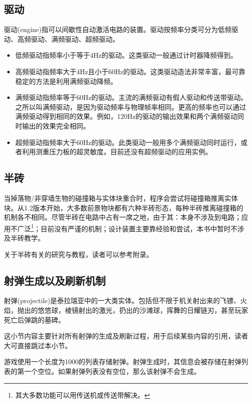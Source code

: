 \subsection{驱动}

驱动(engine)指可以间歇性自动激活电路的装置。驱动按频率分类可分为低频驱动、高频驱动、满频驱动、超频驱动。

\begin{itemize}
\item 低频驱动指频率小于等于4Hz的驱动。这类驱动一般通过计时器降频得到。
\item 高频驱动指频率大于4Hz且小于60Hz的驱动。这类驱动造法非常丰富，最可靠稳定的方法是利用满频驱动降频。
\item 满频驱动指频率等于60Hz的驱动。主流的满频驱动有假人驱动和传送带驱动。之所以叫满频驱动，是因为驱动频率与物理帧率相同。更高的频率也可以通过满频驱动得到相同的效果。例如，120Hz的驱动的输出效果和两个满频驱动同时输出的效果完全相同。
\item 超频驱动指频率大于60Hz的驱动。此类驱动一般用多个满频驱动同时运行，或者利用测重压力板的超灵敏度。目前还没有超频驱动的应用实例。
\end{itemize}

\subsection{半砖}

当掉落物/非穿墙生物的碰撞箱与实体块重合时，程序会尝试将碰撞箱推离实体块。从1.2版本开始，大多数前景物块都有六种半砖形态，每种半砖推离碰撞箱的机制各不相同。尽管半砖在电路中占有一席之地，由于其：本身不涉及到电路；应用不广泛\footnote{其大多数功能可以用传送机或传送带解决。}；目前没有严谨的机制；设计装置主要靠经验和尝试，本书中暂时不涉及半砖教学。

关于半砖有关的研究与教程，读者可以参考附录。

\subsection{射弹生成以及刷新机制}
射弹(projectile)是泰拉瑞亚中的一大类实体。包括但不限于机关射出来的飞镖、火焰，抛出的悠悠球，棱镜射出的激光，扔出的沙滩球，挥舞的日耀链刃，甚至玩家死亡后弹跳的墓碑。

这小节内容主要针对所有射弹的生成及刷新过程，用于后续某些内容的引用，读者大可直接跳过本小节。

游戏使用一个长度为1000的列表存储射弹。射弹生成时，其信息会被存储在射弹列表的第一个空位。如果射弹列表没有空位，那么该射弹不会生成。


